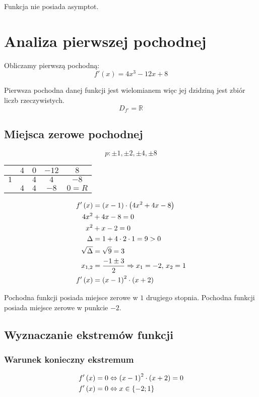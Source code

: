 \documentclass[a4paper,12pt]{article}
\newcommand{\podx}{
		\ensuremath f' \left( x \right)
	}
\begin{document}
Funkcja nie posiada asymptot.

\section{Analiza pierwszej pochodnej}
Obliczamy pierwszą pochodną:
\[ f' \left( x \right) = 4x^3 - 12x + 8 \]

Pierwsza pochodna danej funkcji jest wielomianem więc jej dzidziną jest zbiór liczb rzeczywistych.
\[ D_{f'} = \mathbb{R} \]

\subsection{Miejsca zerowe pochodnej}
\[ p: \pm 1, \pm 2, \pm 4, \pm 8\]
\begin{center}
	\begin{tabular}{l|c|c|c|c}		
		& $4$	& $0$	& $-12$	& $8$	\\ \hline
	$1$	&	& $4$	& $4$	& $-8$	\\ \hline
		& $4$	& $4$	& $-8$	& $0 = R$\\ 
	\end{tabular}
\end{center}
\begin{align*}
	\podx &= \left( x - 1 \right) \cdot \left( 4x^2 + 4x - 8 \right) \\
	4x^2 &+ 4x - 8 = 0 \\
	x^2 &+ x - 2 = 0 \\
	\Delta &= 1 + 4 \cdot 2 \cdot 1 = 9 > 0\\
	\sqrt{\Delta} &= \sqrt{9} = 3\\
	x_{1, 2} &= \frac{-1 \pm 3}{2} \Rightarrow x_1 = -2, \, x_2 = 1\\
	\podx &= \left( x - 1 \right)^2 \cdot \left( x + 2 \right)
\end{align*}

Pochodna funkcji posiada miejsce zerowe w $1$ drugiego stopnia. Pochodna funkcji posiada miejsce zerowe w punkcie $-2$. 

\subsection{Wyznaczanie ekstremów funkcji}
\subsubsection{Warunek konieczny ekstremum}

\begin{align*}
	\podx &= 0 \Leftrightarrow \left( x - 1 \right)^2 \cdot \left( x + 2 \right)  = 0\\
	\podx &= 0 \Leftrightarrow x \in \left\{ -2; 1 \right\}
\end{align*}
\end{document}
